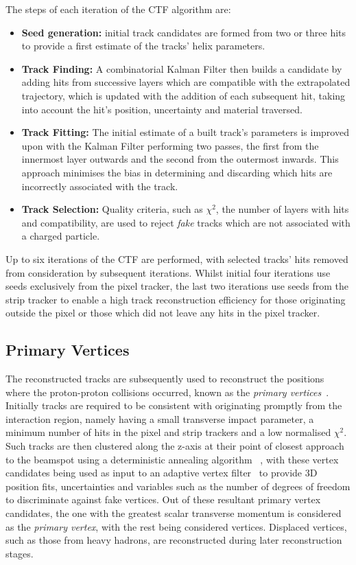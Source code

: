The steps of each iteration	of the CTF algorithm are:
\begin{itemize}
\item \textbf{Seed generation:} initial track candidates are formed from two or three hits to provide a first estimate of the tracks' helix parameters.
\item \textbf{Track Finding:} A combinatorial Kalman Filter then builds a candidate by adding hits from successive layers which are compatible with the extrapolated trajectory, which is updated with the addition of each subsequent hit, taking into account the hit's position, uncertainty and material traversed.
\item \textbf{Track Fitting:} The initial estimate of a built track's parameters is improved upon with the Kalman Filter performing two passes, the first from the innermost layer outwards and the second from the outermost inwards.
This approach minimises the bias in determining and discarding which hits are incorrectly associated with the track.
\item \textbf{Track Selection:} Quality criteria, such as $\chi^{2}$, the number of layers with hits and compatibility, are used to reject \emph{fake} tracks which are not associated with a charged particle.
\end{itemize}

Up to six iterations of the CTF are performed, with selected tracks' hits removed from consideration by subsequent iterations.
Whilst initial four iterations use seeds exclusively from the pixel tracker, the last two iterations use seeds from the strip tracker to enable a high track reconstruction efficiency for those originating outside the pixel or those which did not leave any hits in the pixel tracker.

\subsection{Primary Vertices}\label{subsec:vertices}
The reconstructed tracks are subsequently used to reconstruct the positions where the proton-proton collisions occurred, known as the \emph{primary vertices}~\cite{Speer:2006mh,Chatrchyan:2014fea}.
Initially tracks are required to be consistent with originating promptly from the interaction region, namely having a small transverse impact parameter, a minimum number of hits in the pixel and strip trackers and a low normalised $\chi^{2}$.
Such tracks are then clustered along the z-axis at their point of closest approach to the beamspot using a deterministic annealing algorithm	~\cite{Kenneth:1998i}, with these vertex candidates being used as input to an adaptive vertex filter~\cite{Fruhwirth:2007hz} to provide 3D position fits, uncertainties and variables such as the number of degrees of freedom to discriminate against fake vertices.
Out of these resultant primary vertex candidates, the one with the greatest scalar transverse momentum is considered as the \emph{primary vertex}, with the rest being considered \PU vertices.
Displaced vertices, such as those from heavy hadrons, are reconstructed during later reconstruction stages.

